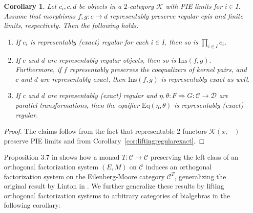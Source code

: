 \documentclass[11pt]{article}
\theoremstyle{plain}
\newtheorem{corollary}[theorem]{Corollary}
\theoremstyle{definition}
\numberwithin{equation}{section}
\newcommand{\C}{\mathcal{C}}
\newcommand{\D}{\mathcal{D}}
\newcommand{\K}{\mathcal{K}}
\newcommand{\Ins}{\mathrm{Ins}}
\newcommand{\Eq}{\mathrm{Eq}}
\begin{document}
\begin{corollary}\label{cor:pie_exactness_creation_2cat}
   Let $c_i, c,d$ be objects in a $2$-category $\K$ with PIE limits for $i\in I$. Assume that morphisms $f,g\colon c\to d$ representably preserve regular epis and finite limits, respectively. Then the following holds:
   \begin{enumerate}
       \item If $c_i$ is representably (exact) regular for each $i\in I$, then so is $\prod_{i\in I} c_i$.
       \item If $c$ and $d$ are representably regular objects, then so is $\Ins(f,g)$. Furthermore, if $f$ representably preserves the coequalizers of kernel pairs, and $c$ and $d$ are representably exact, then $\Ins(f,g)$ is representably exact as well.
       \item If $c$ and $d$ are representably (exact) regular and $\eta,\theta\colon F\Rightarrow G\colon \C\to \D$ are parallel transformations, then the equifier $\Eq(\eta,\theta)$ is representably (exact) regular.
   \end{enumerate}
\end{corollary}

\begin{proof}
   The claims follow from the fact that representable $2$-functors $\K(x,-)$ preserve PIE limits and from Corollary~\ref{cor:liftingregularexact}.
\end{proof}

Proposition 3.7 in \cite{Wissmann2022Minimality} shows how a monad $T\colon \C\to \C$ preserving the left class of an orthogonal factorization system $(E,M)$ on $\C$ induces an orthogonal factorization system on the Eilenberg-Moore category $\C^T$, generalizing the original result by Linton in \cite{Linton1969}. We further generalize these results by lifting orthogonal factorization systems to arbitrary categories of bialgebras in the following corollary:
\end{document}
